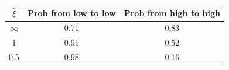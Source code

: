 \begin{tabular}{ccc}
\hline
\rule{0pt}{1.2em}
$\widehat \xi$  &Prob from low to low& Prob from high to high \\
\hline
$\infty$ &  0.71 & 0.83 \\
1 &  0.91 & 0.52 \\
0.5 &  0.98 & 0.16 \\


\hline
\end{tabular}

